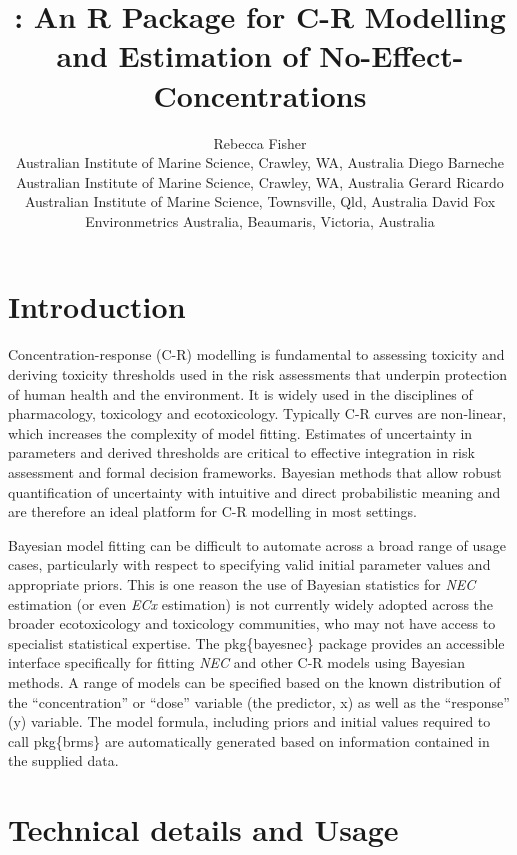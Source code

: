 \documentclass[
]{jss}
\author{
Rebecca Fisher\\Australian Institute of Marine Science, Crawley, WA,
Australia \And Diego Barneche\\Australian Institute of Marine Science,
Crawley, WA, Australia \And Gerard Ricardo\\Australian Institute of
Marine Science, Townsville, Qld, Australia \And David
Fox\\Environmetrics Australia, Beaumaris, Victoria, Australia
}
\title{\pkg{bayesnec}: An R Package for C-R Modelling and Estimation of
No-Effect-Concentrations}
\begin{document}
\hypertarget{introduction}{%
\section{Introduction}\label{introduction}}

Concentration-response (C-R) modelling is fundamental to assessing
toxicity and deriving toxicity thresholds used in the risk assessments
that underpin protection of human health and the environment. It is
widely used in the disciplines of pharmacology, toxicology and
ecotoxicology. Typically C-R curves are non-linear, which increases the
complexity of model fitting. Estimates of uncertainty in parameters and
derived thresholds are critical to effective integration in risk
assessment and formal decision frameworks. Bayesian methods that allow
robust quantification of uncertainty with intuitive and direct
probabilistic meaning \citep{Ellison1996} and are therefore an ideal
platform for C-R modelling in most settings.

Bayesian model fitting can be difficult to automate across a broad range
of usage cases, particularly with respect to specifying valid initial
parameter values and appropriate priors. This is one reason the use of
Bayesian statistics for \emph{NEC} estimation (or even \emph{ECx}
estimation) is not currently widely adopted across the broader
ecotoxicology and toxicology communities, who may not have access to
specialist statistical expertise. The pkg\{bayesnec\} package provides
an accessible interface specifically for fitting \emph{NEC} and other
C-R models using Bayesian methods. A range of models can be specified
based on the known distribution of the ``concentration'' or ``dose''
variable (the predictor, x) as well as the ``response'' (y) variable.
The model formula, including priors and initial values required to call
pkg\{brms\} are automatically generated based on information contained
in the supplied data.

\hypertarget{technical-details-and-usage}{%
\section{Technical details and
Usage}\label{technical-details-and-usage}}
\end{document}
